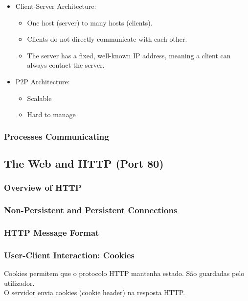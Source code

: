 \documentclass[12pt]{article}
\begin{document}
\begin{itemize}
    \item Client-Server Architecture:
        \begin{itemize}
            \item One host (server) to many hosts (clients).
            \item Clients do not directly communicate with each other.
            \item The server has a fixed, well-known IP address, meaning a client can always contact the server.
        \end{itemize}
    \item P2P Architecture:
        \begin{itemize}
            \item Scalable
            \item Hard to manage
        \end{itemize}
\end{itemize}

\subsubsection{Processes Communicating}

\subsection{The Web and HTTP (Port 80)}

\subsubsection{Overview of HTTP}

\subsubsection{Non-Persistent and Persistent Connections}

\subsubsection{HTTP Message Format}

\subsubsection{User-Client Interaction: Cookies}

Cookies permitem que o protocolo HTTP mantenha estado. São guardadas pelo utilizador. \\
O servidor envia cookies (cookie header) na resposta HTTP.
\end{document}
